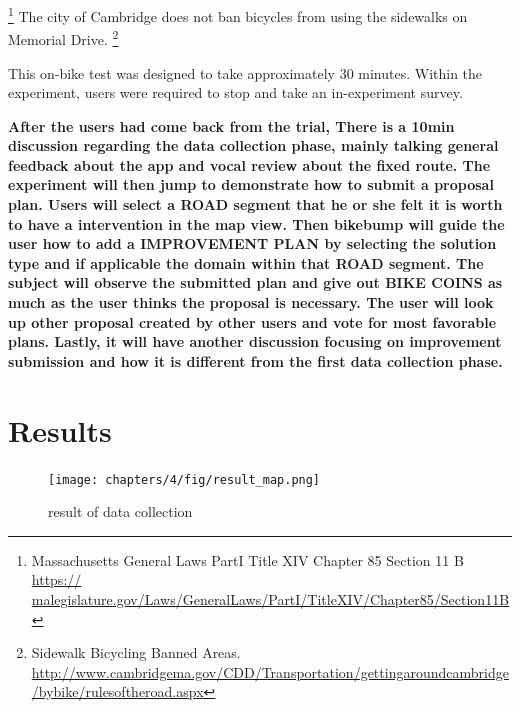 \footnote{Massachusetts General Laws PartI Title XIV Chapter 85 Section 11 B
\url{https:// malegislature.gov/Laws/GeneralLaws/PartI/TitleXIV/Chapter85/Section11B}
}
The city of Cambridge does not ban bicycles from using the sidewalks on Memorial Drive.
\footnote{Sidewalk Bicycling Banned Areas.
\url{http://www.cambridgema.gov/CDD/Transportation/gettingaroundcambridge/bybike/rulesoftheroad.aspx}
}

This on-bike test was designed to take approximately 30 minutes. Within the experiment, users were required to stop and take an in-experiment survey.

\textbf{After the users had come back from the trial, There is a 10min discussion regarding the data collection phase, mainly talking general feedback about the app and vocal review about the fixed route.
The experiment will then jump to demonstrate how to submit a proposal plan. Users will select a ROAD segment that he or she felt it is worth to have a intervention in the map view. Then bikebump will guide the user how to add a IMPROVEMENT PLAN by selecting the solution type and if applicable the domain within that ROAD segment. The subject will observe the submitted plan and give out BIKE COINS as much as the user thinks the proposal is necessary. The user will look up other proposal created by other users and vote for most favorable plans. Lastly, it will have another discussion focusing on improvement submission and how it is different from the first data collection phase.
}

\clearpage

\section{Results}

\begin{figure}[!htb]
  \texttt{[image: chapters/4/fig/result\_map.png]}               
  \caption[result map]{result of data collection} 
  \label{fig:map_result}
\end{figure}


